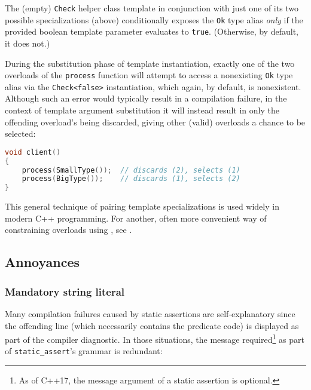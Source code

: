 \noindent The (empty) \lstinline!Check! helper class template in conjunction with
just one of its two possible specializations (above) conditionally
exposes the \lstinline!Ok! type alias \emph{only} if the provided boolean
template parameter evaluates to \lstinline!true!. (Otherwise, by default, it
does not.) 

During the substitution phase of template instantiation,
exactly one of the two overloads of the \lstinline!process! function will
attempt to access a nonexisting \lstinline!Ok! type alias via the
\lstinline!Check<false>! instantiation, which again, by default, is
nonexistent. Although such an error would typically result in a
compilation failure, in the context of template argument substitution it
will instead result in only the offending overload's being discarded,
giving other (valid) overloads a chance to be selected:

\begin{lstlisting}[language=C++]
void client()
{
    process(SmallType());  // discards (2), selects (1)
    process(BigType());    // discards (1), selects (2)
}
\end{lstlisting}
    
\noindent This general technique of pairing template specializations is used widely
in modern C++ programming. For another, often more convenient way of
constraining overloads using , see 
.

\subsection[Annoyances]{Annoyances}\label{static-annoyances}

\subsubsection[Mandatory string literal]{Mandatory string literal}\label{mandatory-string-literal}

Many compilation failures caused by static assertions are
self-explanatory since the offending line (which necessarily contains the
predicate code) is displayed as part of the compiler diagnostic. In
those situations, the message required{\cprotect\footnote{As of C++17,
  the message argument of a static assertion is optional.}} as part of
\lstinline!static_assert!'s grammar is redundant:

